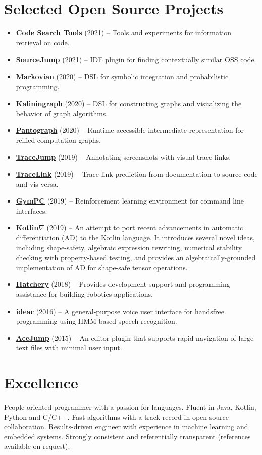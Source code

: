 \documentclass[letterpaper,11pt]{article}
\newcommand{\resumeItem}[2]{
  \item\small{\textbf{#1}{ #2 }}
}
\newcommand{\resumeSubItem}[2]{\resumeItem{#1}{#2}}
\newcommand{\resumeSubHeadingListStart}{\begin{itemize}[leftmargin=*]}
\newcommand{\resumeSubHeadingListEnd}{\end{itemize}}
\begin{document}
\begin{justify}
\section{Selected Open Source Projects}
\resumeSubHeadingListStart
\resumeSubItem{\href{https://github.com/breandan/gym-fs}{Code Search Tools}}{(2021) -- Tools and experiments for information retrieval on code.}
\resumeSubItem{\href{https://github.com/acejump/sourcejump}{SourceJump}}{(2021) -- IDE plugin for finding contextually similar OSS code.}
\resumeSubItem{\href{https://github.com/breandan/markovian}{Markovian}}{(2020) -- DSL for symbolic integration and probabilistic programming.}
\resumeSubItem{\href{https://github.com/breandan/kaliningraph}{Kaliningraph}}{(2020) -- DSL for constructing graphs and visualizing the behavior of graph algorithms.}
\resumeSubItem{\href{https://github.com/breandan/pantograph}{Pantograph}}{(2020) -- Runtime accessible intermediate representation for reified computation graphs.}
\resumeSubItem{\href{https://github.com/acejump/tracejump}{TraceJump}}{(2019) -- Annotating screenshots with visual trace links.}
\resumeSubItem{\href{https://github.com/breandan/tracelink}{TraceLink}}{(2019) -- Trace link prediction from documentation to source code and vis versa.}
\resumeSubItem{\href{https://github.com/breandan/gym-pc}{GymPC}}{(2019) -- Reinforcement learning environment for command line interfaces.}
\resumeSubItem{\href{https://github.com/breandan/kotlingrad}{Kotlin$\nabla$}}{(2019) -- An attempt to port recent advancements in automatic differentiation (AD) to the Kotlin language. It introduces several novel ideas, including shape-safety, algebraic expression rewriting, numerical stability checking with property-based testing, and provides an algebraically-grounded implementation of AD for shape-safe tensor operations.}
\resumeSubItem{\href{https://github.com/duckietown/hatchery}{Hatchery}}{(2018) -- Provides development support and programming assistance for building robotics applications.}
\resumeSubItem{\href{https://github.com/OpenASR/idear}{idear}}{(2016) -- A general-purpose voice user interface for handsfree programming using HMM-based speech recognition.}
\resumeSubItem{\href{https://github.com/acejump/AceJump}{AceJump}}{(2015) -- An editor plugin that supports rapid navigation of large text files with minimal user input.}
\resumeSubHeadingListEnd

\section{Excellence}
People-oriented programmer with a passion for languages. Fluent in Java, Kotlin, Python and C/C++. Fast algorithms with a track record in open source collaboration. Results-driven engineer with experience in machine learning and embedded systems. Strongly consistent and referentially transparent (references available on request).
\end{justify}
\end{document}
